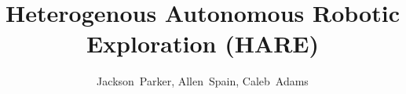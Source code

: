 \documentclass[conference]{IEEEtran}
\begin{document}
\title{Heterogenous Autonomous Robotic Exploration (HARE)}

\author{Jackson~Parker, Allen~Spain, Caleb~Adams}












\maketitle
\thispagestyle{plain}
\pagestyle{plain}
\end{document}
